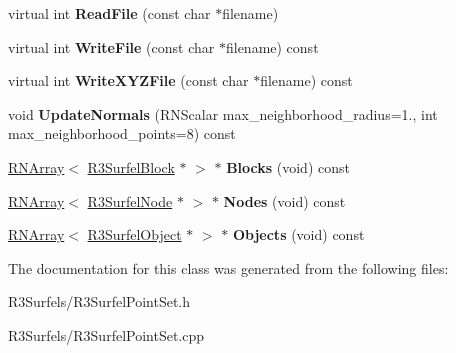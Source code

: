 \begin{DoxyCompactItemize}
\item 
virtual int {\bfseries Read\+File} (const char $\ast$filename)\hypertarget{class_r3_surfel_point_set_a4252674cba71f493c6422bed4996bc03}{}\label{class_r3_surfel_point_set_a4252674cba71f493c6422bed4996bc03}

\item 
virtual int {\bfseries Write\+File} (const char $\ast$filename) const \hypertarget{class_r3_surfel_point_set_ad7d10d1e1e45a36f65c4a28836a31a41}{}\label{class_r3_surfel_point_set_ad7d10d1e1e45a36f65c4a28836a31a41}

\item 
virtual int {\bfseries Write\+X\+Y\+Z\+File} (const char $\ast$filename) const \hypertarget{class_r3_surfel_point_set_aed36200552fb5535288453d0ad7acaa9}{}\label{class_r3_surfel_point_set_aed36200552fb5535288453d0ad7acaa9}

\item 
void {\bfseries Update\+Normals} (R\+N\+Scalar max\+\_\+neighborhood\+\_\+radius=1., int max\+\_\+neighborhood\+\_\+points=8) const \hypertarget{class_r3_surfel_point_set_aae99ac5ca3562f3b6e11d3ec484d405a}{}\label{class_r3_surfel_point_set_aae99ac5ca3562f3b6e11d3ec484d405a}

\item 
\hyperlink{class_r_n_array}{R\+N\+Array}$<$ \hyperlink{class_r3_surfel_block}{R3\+Surfel\+Block} $\ast$ $>$ $\ast$ {\bfseries Blocks} (void) const \hypertarget{class_r3_surfel_point_set_a935e8814a5494d508596eb78e524fd6c}{}\label{class_r3_surfel_point_set_a935e8814a5494d508596eb78e524fd6c}

\item 
\hyperlink{class_r_n_array}{R\+N\+Array}$<$ \hyperlink{class_r3_surfel_node}{R3\+Surfel\+Node} $\ast$ $>$ $\ast$ {\bfseries Nodes} (void) const \hypertarget{class_r3_surfel_point_set_a6992ee86f62d9003ad8f1a31e0a76cad}{}\label{class_r3_surfel_point_set_a6992ee86f62d9003ad8f1a31e0a76cad}

\item 
\hyperlink{class_r_n_array}{R\+N\+Array}$<$ \hyperlink{class_r3_surfel_object}{R3\+Surfel\+Object} $\ast$ $>$ $\ast$ {\bfseries Objects} (void) const \hypertarget{class_r3_surfel_point_set_a7f67117a6cb89a463549da330fad3127}{}\label{class_r3_surfel_point_set_a7f67117a6cb89a463549da330fad3127}

\end{DoxyCompactItemize}


The documentation for this class was generated from the following files\+:\begin{DoxyCompactItemize}
\item 
R3\+Surfels/R3\+Surfel\+Point\+Set.\+h\item 
R3\+Surfels/R3\+Surfel\+Point\+Set.\+cpp\end{DoxyCompactItemize}
